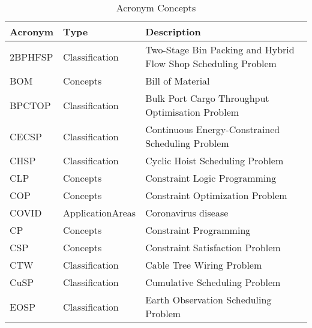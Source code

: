 {\scriptsize
\begin{longtable}{llp{12cm}}
\caption{Acronym Concepts}\\ \toprule
Acronym & Type & Description\\ \midrule\endhead
\bottomrule
\endfoot
\index{2BPHFSP (Two-Stage Bin Packing and Hybrid Flow Shop Scheduling Problem)}\index{Two-Stage Bin Packing and Hybrid Flow Shop Scheduling Problem (2BPHFSP)}2BPHFSP & Classification & Two-Stage Bin Packing and Hybrid Flow Shop Scheduling Problem\\
\index{BOM (Bill of Material)}\index{Bill of Material (BOM)}BOM & Concepts & Bill of Material\\
\index{BPCTOP (Bulk Port Cargo Throughput Optimisation Problem)}\index{Bulk Port Cargo Throughput Optimisation Problem (BPCTOP)}BPCTOP & Classification & Bulk Port Cargo Throughput Optimisation Problem\\
\index{CECSP (Continuous Energy-Constrained Scheduling Problem)}\index{Continuous Energy-Constrained Scheduling Problem (CECSP)}CECSP & Classification & Continuous Energy-Constrained Scheduling Problem\\
\index{CHSP (Cyclic Hoist Scheduling Problem)}\index{Cyclic Hoist Scheduling Problem (CHSP)}CHSP & Classification & Cyclic Hoist Scheduling Problem\\
\index{CLP (Constraint Logic Programming)}\index{Constraint Logic Programming (CLP)}CLP & Concepts & Constraint Logic Programming\\
\index{COP (Constraint Optimization Problem)}\index{Constraint Optimization Problem (COP)}COP & Concepts & Constraint Optimization Problem\\
\index{COVID (Coronavirus disease)}\index{Coronavirus disease (COVID)}COVID & ApplicationAreas & Coronavirus disease\\
\index{CP (Constraint Programming)}\index{Constraint Programming (CP)}CP & Concepts & Constraint Programming\\
\index{CSP (Constraint Satisfaction Problem)}\index{Constraint Satisfaction Problem (CSP)}CSP & Concepts & Constraint Satisfaction Problem\\
\index{CTW (Cable Tree Wiring Problem)}\index{Cable Tree Wiring Problem (CTW)}CTW & Classification & Cable Tree Wiring Problem\\
\index{CuSP (Cumulative Scheduling Problem)}\index{Cumulative Scheduling Problem (CuSP)}CuSP & Classification & Cumulative Scheduling Problem\\
\index{EOSP (Earth Observation Scheduling Problem)}\index{Earth Observation Scheduling Problem (EOSP)}EOSP & Classification & Earth Observation Scheduling Problem\\

\end{longtable}}
